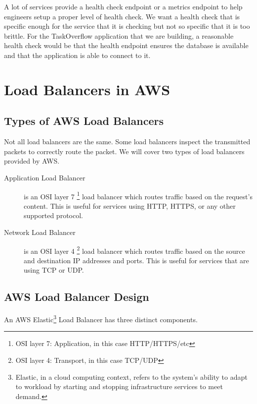 \documentclass{csse4400}
\begin{document}
\noindent
A lot of services provide a health check endpoint or a metrics endpoint to help engineers setup a proper level of health check.
We want a health check that is specific enough for the service that it is checking but not so specific that it is too brittle.
For the TaskOverflow application that we are building,
a reasonable health check would be that the health endpoint ensures the database is available
and that the application is able to connect to it.


\section{Load Balancers in AWS}

\subsection{Types of AWS Load Balancers}
Not all load balancers are the same.
Some load balancers inspect the transmitted packets to correctly route the packet.
We will cover two types of load balancers provided by AWS.

\begin{description}
  \item[Application Load Balancer] is an OSI layer 7%
\footnote{OSI layer 7: Application, in this case HTTP/HTTPS/etc}
load balancer which routes traffic based on the request's content.
      This is useful for services using HTTP, HTTPS, or any other supported protocol.
  \item[Network Load Balancer] is an OSI layer 4%
\footnote{OSI layer 4: Transport, in this case TCP/UDP}
load balancer which routes traffic based on the source and destination IP addresses and ports.
This is useful for services that are using TCP or UDP.
\end{description}

\subsection{AWS Load Balancer Design}

An AWS Elastic\footnote{Elastic, in a cloud computing context, refers to the system's ability to adapt to workload by starting and stopping infrastructure services to meet demand.} Load Balancer has three distinct components. 
\end{document}

